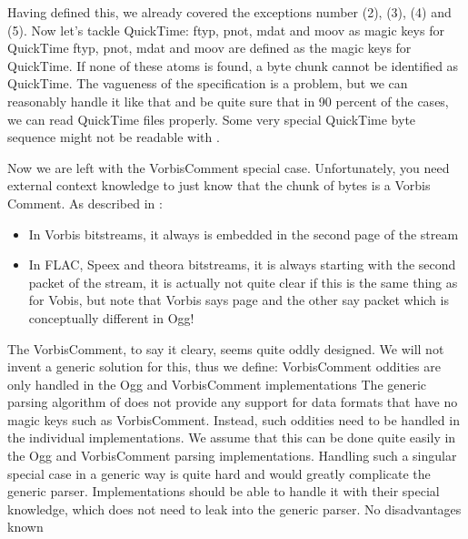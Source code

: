 Having defined this, we already covered the exceptions number (2), (3), (4) and (5). Now let's tackle QuickTime:
{%
ftyp, pnot, mdat and moov as magic keys for QuickTime
}
{%
ftyp, pnot, mdat and moov are defined as the magic keys for QuickTime. If none of these atoms is found, a byte chunk cannot be identified as QuickTime.
}
{%
The vagueness of the specification is a problem, but we can reasonably handle it like that and be quite sure that in 90 percent of the cases, we can read QuickTime files properly.
}
{%
Some very special QuickTime byte sequence might not be readable with \LibName{}.
}

Now we are left with the VorbisComment special case. Unfortunately, you need external context knowledge to just know that the chunk of bytes is a Vorbis Comment. As described in \cite[MC17]{MC17}:
\begin{itemize}
\item In Vorbis bitstreams, it always is embedded in the second page of the stream
\item In FLAC, Speex and theora bitstreams, it is always starting with the second packet of the stream, it is actually not quite clear if this is the same thing as for Vobis, but note that Vorbis says page and the other say packet which is conceptually different in Ogg!
\end{itemize}

The VorbisComment, to say it cleary, seems quite oddly designed. We will not invent a generic solution for this, thus we define:
{%
VorbisComment oddities are only handled in the Ogg and VorbisComment implementations
}
{%
The generic parsing algorithm of \LibName{} does not provide any support for data formats that have no magic keys such as VorbisComment. Instead, such oddities need to be handled in the individual implementations. We assume that this can be done quite easily in the Ogg and VorbisComment parsing implementations.
}
{%
Handling such a singular special case in a generic way is quite hard and would greatly complicate the generic parser. Implementations should be able to handle it with their special knowledge, which does not need to leak into the generic parser.
}
{%
No disadvantages known
}

